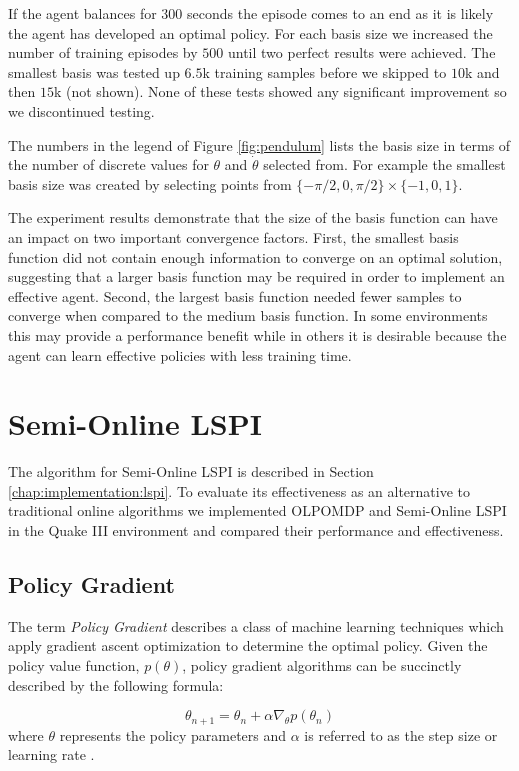 If the agent balances for $300$ seconds the episode comes to an end as it is likely the agent has developed an optimal policy. For each basis size we increased the number of training episodes by $500$ until two perfect results were achieved. The smallest basis was tested up $6.5$k training samples before we skipped to $10$k and then $15$k (not shown). None of these tests showed any significant improvement so we discontinued testing.

The numbers in the legend of Figure \ref{fig:pendulum} lists the basis size in terms of the number of discrete values for $\theta$ and $\dot{\theta}$ selected from. For example the smallest basis size was created by selecting points from $\{-\pi/2, 0, \pi/2\} \times \{-1, 0, 1\}$.

The experiment results demonstrate that the size of the basis function can have an impact on two important convergence factors. First, the smallest basis function did not contain enough information to converge on an optimal solution, suggesting that a larger basis function may be required in order to implement an effective agent. Second, the largest basis function needed fewer samples to converge when compared to the medium basis function. In some environments this may provide a performance benefit while in others it is desirable because the agent can learn effective policies with less training time.

\section{Semi-Online LSPI}

The algorithm for Semi-Online LSPI is described in Section \ref{chap:implementation:lspi}. To evaluate its effectiveness as an alternative to traditional online algorithms we implemented OLPOMDP and Semi-Online LSPI in the Quake III environment and compared their performance and effectiveness.

\subsection{Policy Gradient}

The term \emph{Policy Gradient} describes a class of machine learning techniques which apply gradient ascent optimization to determine the optimal policy. Given the policy value function, $p(\theta)$, policy gradient algorithms can be succinctly described by the following formula:

\[
    \theta_{n+1} = \theta_{n} + \alpha\nabla_\theta p(\theta_{n})
\]
where $\theta$ represents the policy parameters and $\alpha$ is referred to as the step size or learning rate \cite{norvig}\cite{bishop}.

